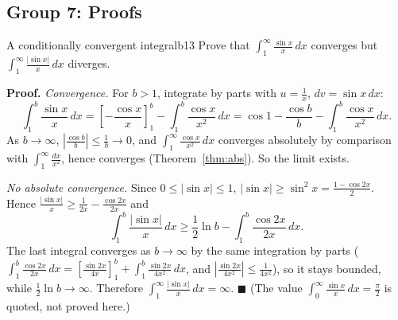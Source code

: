 \documentclass[11pt]{article}
\begin{document}
\subsection*{Group 7: Proofs}

\begin{exmp}{A conditionally convergent integral}{b13}
Prove that $\displaystyle\int_1^\infty\frac{\sin x}x\,dx$ converges but $\displaystyle\int_1^\infty\frac{\lvert\sin x\rvert}x\,dx$ diverges.

\textbf{Proof.} \emph{Convergence.} For $b>1$, integrate by parts with $u=\frac1x$, $dv=\sin x\,dx$:
\[\int_1^b\frac{\sin x}x\,dx=\left[-\frac{\cos x}x\right]_1^b-\int_1^b\frac{\cos x}{x^2}\,dx=\cos1-\frac{\cos b}b-\int_1^b\frac{\cos x}{x^2}\,dx .\]
As $b\to\infty$, $\left\lvert\frac{\cos b}b\right\rvert\le\frac1b\to0$, and $\int_1^\infty\frac{\cos x}{x^2}\,dx$ converges absolutely by comparison with $\int_1^\infty\frac{dx}{x^2}$, hence converges (Theorem~\ref{thm:abs}). So the limit exists.

\emph{No absolute convergence.} Since $0\le\lvert\sin x\rvert\le1$, $\lvert\sin x\rvert\ge\sin^2x=\frac{1-\cos2x}2$. Hence $\frac{\lvert\sin x\rvert}x\ge\frac1{2x}-\frac{\cos2x}{2x}$ and
\[\int_1^b\frac{\lvert\sin x\rvert}x\,dx\ge\frac12\ln b-\int_1^b\frac{\cos2x}{2x}\,dx .\]
The last integral converges as $b\to\infty$ by the same integration by parts ($\int_1^b\frac{\cos2x}{2x}\,dx=\left[\frac{\sin2x}{4x}\right]_1^b+\int_1^b\frac{\sin2x}{4x^2}\,dx$, and $\left\lvert\frac{\sin2x}{4x^2}\right\rvert\le\frac1{4x^2}$), so it stays bounded, while $\frac12\ln b\to\infty$. Therefore $\int_1^\infty\frac{\lvert\sin x\rvert}x\,dx=\infty$. $\blacksquare$
(The value $\int_0^\infty\frac{\sin x}x\,dx=\frac\pi2$ is quoted, not proved here.)
\end{exmp}
\end{document}
